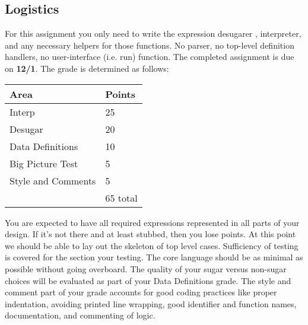 \documentclass[10pt]{article}
\begin{document}
\subsection*{Logistics}

For this assignment you only need to write the expression desugarer , interpreter, and any necessary helpers for those functions. No parser, no top-level definition handlers, no user-interface (i.e. run) function. The completed assignment is due on \textbf{12/1}. The grade is determined as follows:

\begin{center}
\begin{tabular}{ll}
Area & Points \\ \hline
Interp & 25 \\
Desugar & 20 \\
Data Definitions & 10 \\
Big Picture Test & 5 \\
Style and Comments & 5 \\ \hline
 & 65 total
\end{tabular}
\end{center}

You are expected to have all required expressions represented in all parts of your design. If it's not there and at least stubbed, then you lose points. At this point we should be able to lay out the skeleton of top level cases. Sufficiency of testing is covered for the section your testing. The core language should be as minimal as possible without going overboard. The quality of your sugar versus non-sugar choices will be evaluated as part of your Data Definitions grade. The style and comment part of your grade accounts for good coding practices like proper indentation, avoiding printed line wrapping, good identifier and function names, documentation, and commenting of logic. 
\end{document}
